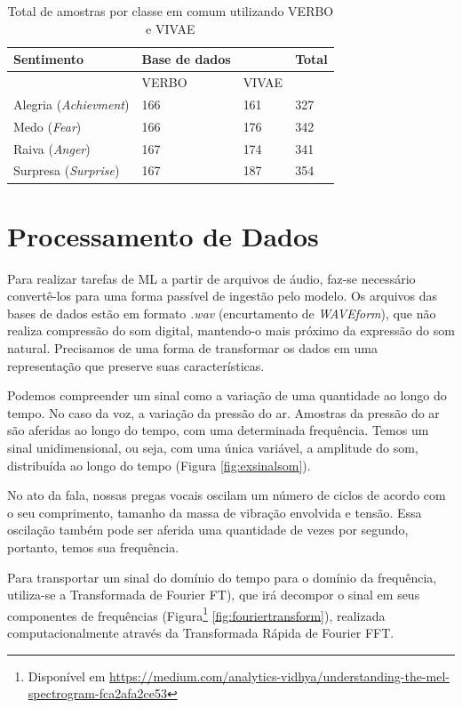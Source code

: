 \begin{table}[]
    \centering
    \caption{Total de amostras por classe em comum utilizando \acrshort{VERBO} e \acrshort{VIVAE}}
    \begin{tabular}{|l|l|l|l|}
    \hline
        Sentimento & Base de dados & ~ & Total \\ \hline
        ~ & VERBO & VIVAE & ~ \\ \hline
        Alegria (\textit{Achievment}) & 166 & 161 & 327 \\ \hline
        Medo (\textit{Fear}) & 166 & 176 & 342 \\ \hline
        Raiva (\textit{Anger}) & 167 & 174 & 341 \\ \hline
        Surpresa (\textit{Surprise}) & 167 & 187 & 354 \\ \hline
    \end{tabular}\label{table:totalporclasse}
\end{table}

\section{Processamento de Dados}\label{sec:procdados}

Para realizar tarefas de \acrshort{ML} a partir de arquivos de áudio, faz-se necessário convertê-los para uma forma passível de ingestão pelo modelo. Os arquivos das bases de dados estão em formato \textit{.wav} (encurtamento de \textit{WAVEform}), que não realiza compressão do som digital, mantendo-o mais próximo da expressão do som natural. Precisamos de uma forma de transformar os dados em uma representação que preserve suas características.

Podemos compreender um sinal como a variação de uma quantidade ao longo do tempo. No caso da voz, a variação da pressão do ar. Amostras da pressão do ar são aferidas ao longo do tempo, com uma determinada frequência. Temos um sinal unidimensional, ou seja, com uma única variável, a amplitude do som, distribuída ao longo do tempo (Figura \ref{fig:exsinalsom}).

No ato da fala, nossas pregas vocais oscilam um número de ciclos de acordo com o  seu comprimento, tamanho da massa de vibração envolvida e tensão. Essa oscilação também pode ser aferida uma quantidade de vezes por segundo, portanto, temos sua frequência.

Para transportar um sinal do domínio do tempo para o domínio da frequência, utiliza-se a Transformada de Fourier \acrlong{FT}), que irá decompor o sinal em seus componentes de frequências (Figura\footnote{Disponível em \url{https://medium.com/analytics-vidhya/understanding-the-mel-spectrogram-fca2afa2ce53}} \ref{fig:fouriertransform}), realizada computacionalmente através da Transformada Rápida de Fourier \acrlong{FFT}. 

